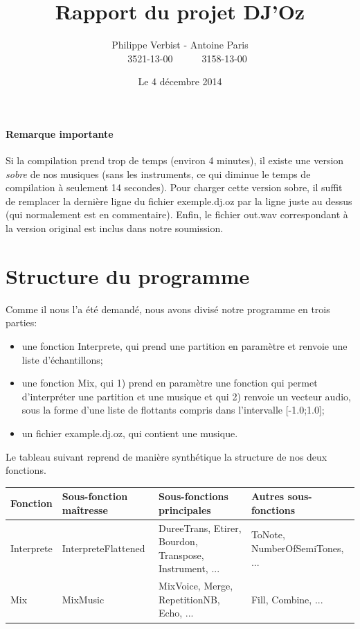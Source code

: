 \documentclass[10pt,a4paper]{article}
\author{Philippe Verbist - Antoine Paris \\ \ \ \ 3521-13-00\ \ \ \ \ \ 3158-13-00}
\title{\textbf{Rapport du projet DJ'Oz}}
\date{Le 4 décembre 2014}
\begin{document}
\sloppy
\maketitle

\paragraph{Remarque importante}
Si la compilation prend trop de temps (environ 4 minutes), il existe une version
\textit{sobre} de nos musiques (sans les instruments, ce qui diminue le temps
de compilation à seulement 14 secondes). Pour charger cette version
sobre, il suffit de remplacer la dernière ligne du fichier exemple.dj.oz
par la ligne juste au dessus (qui normalement est en commentaire).
Enfin, le fichier out.wav correspondant à la version original
est inclus dans notre soumission.

\section{Structure du programme}
Comme il nous l'a été demandé, nous avons divisé notre programme en trois parties:
\begin{itemize}
	\item une fonction Interprete, qui prend une partition en paramètre et renvoie une liste d'échantillons;
	\item une fonction Mix, qui 1) prend en paramètre une fonction qui permet d'interpréter une partition 
	et une musique et qui  2) renvoie un vecteur audio, sous la forme d'une liste de flottants compris dans l'intervalle [-1.0;1.0];
	\item un fichier example.dj.oz, qui contient une musique.
\end{itemize}
\vspace{0.5 cm}

Le tableau suivant reprend de manière synthétique la structure de nos deux fonctions.

\begin{center}
		\begin{tabular}{|p{}|p{}|p{}|p{}|}
		\hline
		\textbf{Fonction}		& \textbf{Sous-fonction maîtresse} 	& \textbf{Sous-fonctions principales} 										& \textbf{Autres sous-fonctions}	\\
		\hline
		Interprete					& InterpreteFlattened								& DureeTrans, Etirer, Bourdon, Transpose, Instrument, ... & ToNote, NumberOfSemiTones, ...	\\
		\hline
		Mix 								& MixMusic 													& MixVoice, Merge, RepetitionNB, Echo, ... 								&  Fill, Combine, ...							\\
		\hline 
		\end{tabular}
\end{center}
	
\end{document}

